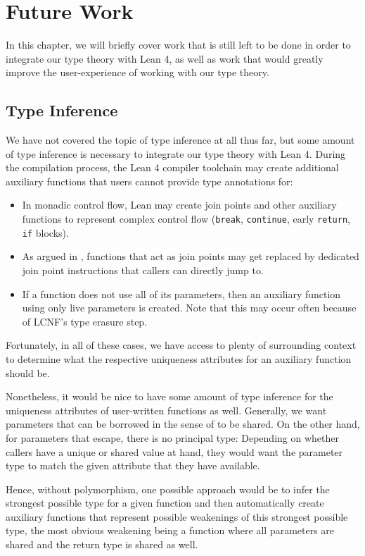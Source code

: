 \chapter{Future Work}\label{sec:futurework}
In this chapter, we will briefly cover work that is still left to be done in order to integrate our type theory with Lean 4, as well as work that would greatly improve the user-experience of working with our type theory.

\section{Type Inference}\label{sec:inference}
We have not covered the topic of type inference at all thus far, but some amount of type inference is necessary to integrate our type theory with Lean 4. During the compilation process, the Lean 4 compiler toolchain may create additional auxiliary functions that users cannot provide type annotations for: 
\begin{itemize}
	\item In monadic control flow, Lean may create join points and other auxiliary functions to represent complex control flow (\lstinline|break|, \lstinline|continue|, early \lstinline|return|, \lstinline|if| blocks).
	\item As argued in , functions that act as join points may get replaced by dedicated join point instructions that callers can directly jump to.
	\item If a function does not use all of its parameters, then an auxiliary function using only live parameters is created. Note that this may occur often because of LCNF's type erasure step.
\end{itemize}
Fortunately, in all of these cases, we have access to plenty of surrounding context to determine what the respective uniqueness attributes for an auxiliary function should be.

Nonetheless, it would be nice to have some amount of type inference for the uniqueness attributes of user-written functions as well. Generally, we want parameters that can be borrowed in the sense of  to be shared. On the other hand, for parameters that escape, there is no principal type: Depending on whether callers have a unique or shared value at hand, they would want the parameter type to match the given attribute that they have available.

Hence, without polymorphism, one possible approach would be to infer the strongest possible type for a given function and then automatically create auxiliary functions that represent possible weakenings of this strongest possible type, the most obvious weakening being a function where all parameters are shared and the return type is shared as well.

